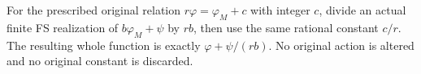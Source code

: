 \begin{remark}
For the prescribed original relation $r\varphi=\varphi_M+c$ with integer
$c$, divide an actual finite FS realization of
$b\varphi_M+\psi$ by $rb$, then use the same rational constant $c/r$.
The resulting whole function is exactly
$\varphi+\psi/(rb)$.  No original action is altered and no original
constant is discarded.
\end{remark}
